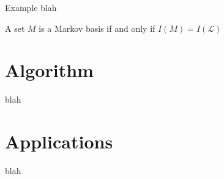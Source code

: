 \documentclass[9pt]{beamer}
\theoremstyle{definition}
\begin{document}
\begin{frame}[fragile]{Example}
  blah
\end{frame}


\begin{frame}[fragile]{}
  \begin{Lemma}
    A set $M$ is a Markov basis if and only if $I(M) = I(\mathcal{L})$
  \end{Lemma}
\end{frame}

\section{Algorithm}

\begin{frame}[fragile]{}
  blah
\end{frame}

\section{Applications}

\begin{frame}[fragile]{}
  blah
\end{frame}



\end{document}
